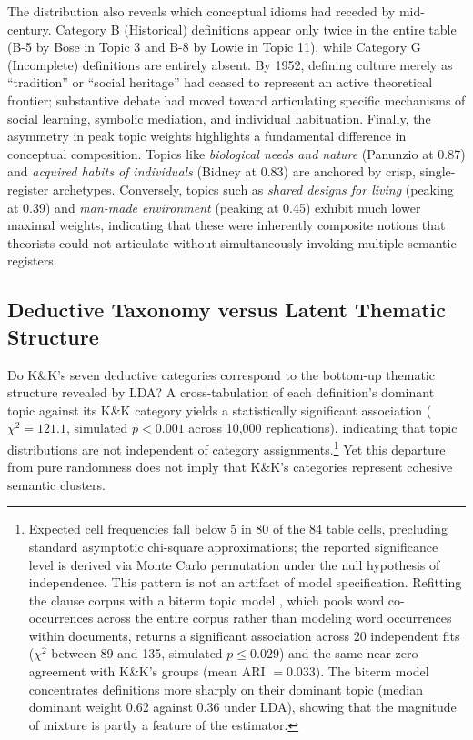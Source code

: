 \documentclass[11pt]{article}
\begin{document}
The distribution also reveals which conceptual idioms had receded by mid-century. Category B (Historical) definitions appear only twice in the entire table (B-5 by Bose in Topic 3 and B-8 by Lowie in Topic 11), while Category G (Incomplete) definitions are entirely absent. By 1952, defining culture merely as ``tradition'' or ``social heritage'' had ceased to represent an active theoretical frontier; substantive debate had moved toward articulating specific mechanisms of social learning, symbolic mediation, and individual habituation. Finally, the asymmetry in peak topic weights highlights a fundamental difference in conceptual composition. Topics like \emph{biological needs and nature} (Panunzio at 0.87) and \emph{acquired habits of individuals} (Bidney at 0.83) are anchored by crisp, single-register archetypes. Conversely, topics such as \emph{shared designs for living} (peaking at 0.39) and \emph{man-made environment} (peaking at 0.45) exhibit much lower maximal weights, indicating that these were inherently composite notions that theorists could not articulate without simultaneously invoking multiple semantic registers.

\subsection{Deductive Taxonomy versus Latent Thematic Structure}

Do K\&K's seven deductive categories correspond to the bottom-up thematic structure revealed by LDA? A cross-tabulation of each definition's dominant topic against its K\&K category yields a statistically significant association ($\chi^2 = 121.1$, simulated $p < 0.001$ across 10,000 replications), indicating that topic distributions are not independent of category assignments.\footnote{Expected cell frequencies fall below 5 in 80 of the 84 table cells, precluding standard asymptotic chi-square approximations; the reported significance level is derived via Monte Carlo permutation under the null hypothesis of independence. This pattern is not an artifact of model specification. Refitting the clause corpus with a biterm topic model \citep{yan2013biterm}, which pools word co-occurrences across the entire corpus rather than modeling word occurrences within documents, returns a significant association across 20 independent fits ($\chi^2$ between 89 and 135, simulated $p \le 0.029$) and the same near-zero agreement with K\&K's groups (mean ARI $= 0.033$). The biterm model concentrates definitions more sharply on their dominant topic (median dominant weight 0.62 against 0.36 under LDA), showing that the magnitude of mixture is partly a feature of the estimator.} Yet this departure from pure randomness does not imply that K\&K's categories represent cohesive semantic clusters.
\end{document}
